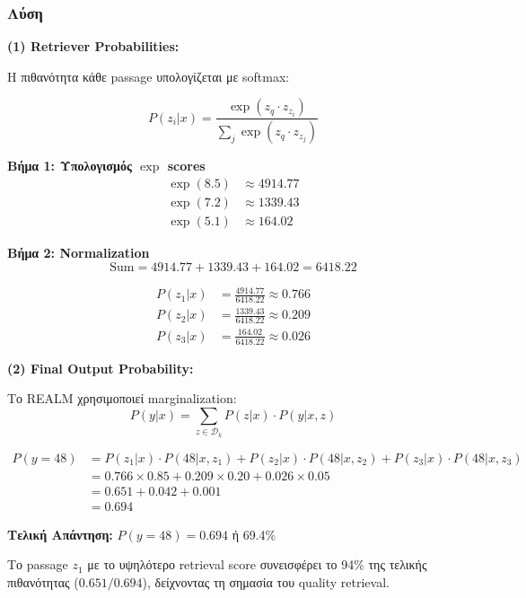 \subsubsection*{Λύση}

\textbf{(1) Retriever Probabilities:}

Η πιθανότητα κάθε passage υπολογίζεται με softmax:

$$P(z_i | x) = \frac{\exp(z_q \cdot z_{z_i})}{\sum_{j} \exp(z_q \cdot z_{z_j})}$$

\textbf{Βήμα 1: Υπολογισμός $\exp$ scores}
\begin{align*}
\exp(8.5) &\approx 4914.77 \\
\exp(7.2) &\approx 1339.43 \\
\exp(5.1) &\approx 164.02
\end{align*}

\textbf{Βήμα 2: Normalization}
$$\text{Sum} = 4914.77 + 1339.43 + 164.02 = 6418.22$$

\begin{align*}
P(z_1 | x) &= \frac{4914.77}{6418.22} \approx 0.766 \\
P(z_2 | x) &= \frac{1339.43}{6418.22} \approx 0.209 \\
P(z_3 | x) &= \frac{164.02}{6418.22} \approx 0.026
\end{align*}

\textbf{(2) Final Output Probability:}

Το REALM χρησιμοποιεί marginalization:
$$P(y | x) = \sum_{z \in \mathcal{D}_k} P(z | x) \cdot P(y | x, z)$$

\begin{align*}
P(y=48) &= P(z_1|x) \cdot P(48|x,z_1) + P(z_2|x) \cdot P(48|x,z_2) + P(z_3|x) \cdot P(48|x,z_3) \\
&= 0.766 \times 0.85 + 0.209 \times 0.20 + 0.026 \times 0.05 \\
&= 0.651 + 0.042 + 0.001 \\
&= \mathbf{0.694}
\end{align*}

\textbf{Τελική Απάντηση:} $P(y=48) = 0.694$ ή 69.4\%

\begin{warningbox}[Σημαντικό]
Το passage $z_1$ με το υψηλότερο retrieval score συνεισφέρει το 94\% της τελικής
πιθανότητας ($0.651/0.694$), δείχνοντας τη σημασία του quality retrieval.
\end{warningbox}

